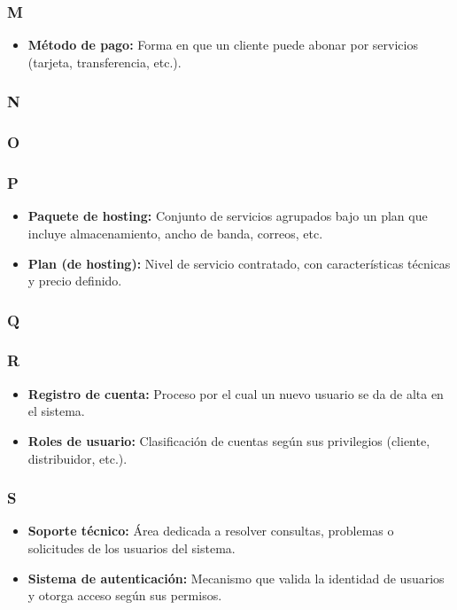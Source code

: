 \subsubsection*{M}
\begin{itemize}
    \item \textbf {Método de pago:} Forma en que un cliente puede abonar por servicios (tarjeta, transferencia, etc.).
\end{itemize}

\subsubsection*{N}

\subsubsection*{O}

\subsubsection*{P}
\begin{itemize}
    \item \textbf{Paquete de hosting:} Conjunto de servicios agrupados bajo un plan que incluye almacenamiento, ancho de banda, correos, etc.
    \item \textbf{Plan (de hosting):} Nivel de servicio contratado, con características técnicas y precio definido.
\end{itemize}

\subsubsection*{Q}

\subsubsection*{R}
\begin{itemize}
    \item \textbf{Registro de cuenta:} Proceso por el cual un nuevo usuario se da de alta en el sistema.
    \item \textbf{Roles de usuario:} Clasificación de cuentas según sus privilegios (cliente, distribuidor, etc.).
\end{itemize}

\subsubsection*{S}
\begin{itemize}
    \item \textbf{Soporte técnico:} Área dedicada a resolver consultas, problemas o solicitudes de los usuarios del sistema.
    \item \textbf{Sistema de autenticación:} Mecanismo que valida la identidad de usuarios y otorga acceso según sus permisos.
\end{itemize}

